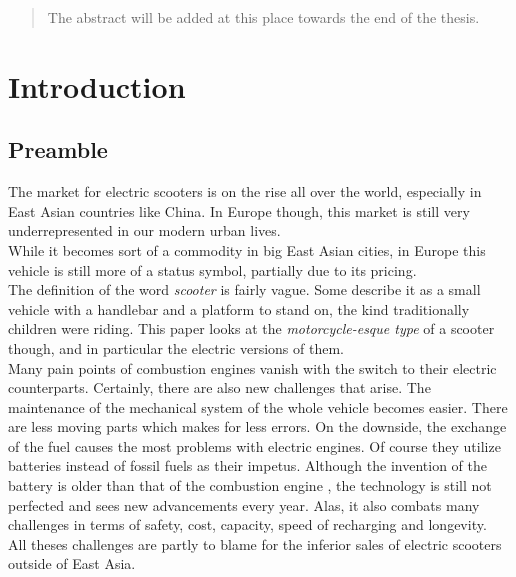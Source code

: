 \documentclass[12pt,a4paper]{report}
\begin{document}



\begin{abstract}

The abstract will be added at this place towards the end of the thesis.

\end{abstract}


\tableofcontents


\chapter{Introduction} \label{chap:intro}


\section{Preamble}

The market for electric scooters is on the rise all over the world,
especially in East Asian countries like China. \cn
In Europe though, this market is still very underrepresented in our modern urban lives.\\
While it becomes sort of a commodity in big East Asian cities, in Europe this vehicle
is still more of a status symbol, partially due to its pricing.\cn \\
The definition of the word \emph{scooter} is fairly vague.
Some describe it as a small vehicle with a handlebar and a platform to stand on,
the kind traditionally children were riding.
This paper looks at the \emph{motorcycle-esque type} of a scooter though, and in
particular the electric versions of them.\\
Many pain points of combustion engines vanish with the switch to their electric
counterparts. Certainly, there are also new challenges that arise.
The maintenance of the mechanical system of the whole vehicle becomes easier.
There are less moving parts which makes for less errors.
On the downside, the exchange of the fuel causes the most problems with electric engines.
Of course they utilize batteries instead of fossil fuels as their impetus.
Although the invention of the battery is older than that of the
combustion engine \cn, the technology is still not perfected and sees new
advancements every year. Alas, it also combats many challenges in terms of
safety, cost, capacity, speed of recharging and longevity.\\
All theses challenges are partly to blame for the inferior sales of electric scooters
outside of East Asia. \cn
\end{document}
